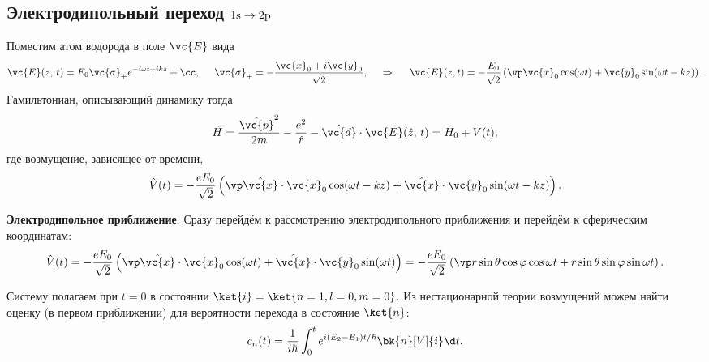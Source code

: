 \setcounter{subsection}{2}
\subsection{Электродипольный переход \texorpdfstring{$1\textnormal{s}\to 2\textnormal{p}$}{1s -> 2p}}



Поместим атом водорода в поле $\vc{E}$ вида
\begin{equation*}
    \vc{E} (z,\, t) = E_0 \vc{\sigma}_+ e^{-i \omega t + i k z} + \cc, 
    \hspace{5 mm} 
    \vc{\sigma}_+ = - \frac{\vc{x}_0 + i \vc{y}_0}{\sqrt{2}},
    \hspace{0.5cm} \Rightarrow \hspace{0.5cm}   
    \vc{E} (z, t) = - \frac{{E}_0}{\sqrt{2}} \left(
        \vp
        \vc{x}_0 \cos(\omega t) + \vc{y}_0 \sin(\omega t - k z)
    \right).
\end{equation*}
Гамильтониан, описывающий динамику тогда
\begin{equation*}
    \hat{H} = \frac{\hat{\vc{p}}^2}{2 m} - \frac{e^2}{\hat{r}} - \hat{\vc{d}} \cdot \vc{E} (\hat{z},\, t) = H_0 + V(t),
\end{equation*}
где возмущение, зависящее от времени,
\begin{equation*}
    \hat{V}(t) = - \frac{e E_0}{\sqrt{2}} \left( \vp
        \hat{\vc{x}} \cdot\vc{x}_0 \cos(\omega t - kz) +\hat{\vc{x}} \cdot \vc{y}_0 \sin(\omega t - k z)
    \right).
\end{equation*}

\textbf{Электродипольное приближение}. Сразу перейдём к рассмотрению электродипольного приближения и перейдём к сферическим координатам:
\begin{equation*}
    \hat{V}(t) = - \frac{e E_0}{\sqrt{2}} \left( \vp
        \hat{\vc{x}} \cdot\vc{x}_0 \cos(\omega t) +\hat{\vc{x}} \cdot \vc{y}_0 \sin(\omega t)
    \right)
    =
    - \frac{e E_0}{\sqrt{2}} \left( \vp
        r \sin \theta \cos \varphi \cos \omega t +
        r \sin \theta \sin \varphi \sin \omega t
    \right)
    .
\end{equation*}

Систему полагаем при $t=0$ в состоянии $\ket{i} = \ket{n=1,l=0,m=0}$. Из нестационарной теории возмущений можем найти оценку (в первом приближении) для вероятности перехода в состояние $\ket{n}$:
\begin{equation*}
    c_n (t) = \frac{1}{i \hbar} \int_0^t e^{i (E_2-E_1)t/\hbar} \bk{n}[V]{i} \d t.
\end{equation*}




